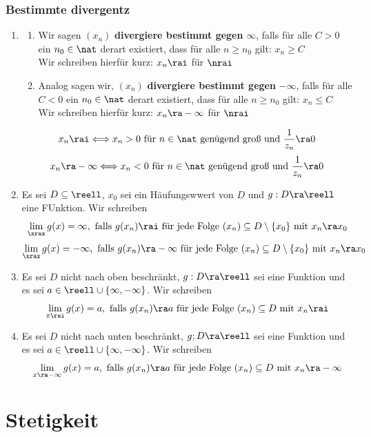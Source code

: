 \documentclass{kit}
\begin{document}
    \subsubsection{Bestimmte divergentz}
      \begin{enumerate}
        \item \begin{enumerate}[label=\roman*)]
            \item Wir sagen $(x_n)$ \textbf{divergiere bestimmt gegen} $\infty$, falls für alle $C>0$ ein $n_0\in\nat$ derart existiert, dass für alle $n\ge n_0$ gilt: $x_n\ge C$\\
              Wir schreiben hierfür kurz: $x_n\rai$ für $\nrai$
            \item Analog sagen wir, $(x_n)$ \textbf{divergiere bestimmt gegen} $-\infty$, falls für alle $C<0$ ein $n_0\in\nat$ derart existiert, dass für alle $n\ge n_0$ gilt: $x_n\le C$\\
              Wir schreiben hierfür kurz: $x_n\ra -\infty$ für $\nrai$
          \end{enumerate}
          $$x_n\rai\Longleftrightarrow x_n>0\text{ für }n\in\nat\text{ genügend groß und }\frac{1}{z_n}\ra0$$
          $$x_n\ra-\infty\Longleftrightarrow x_n<0\text{ für }n\in\nat\text{ genügend groß und }\frac{1}{z_n}\ra0$$
        \item Es sei $D\subseteq\reell$, $x_0$ sei ein Häufungswwert von $D$ und $g:D\ra\reell$ eine FUnktion. Wir schreiben
          $$\lim_\xrax g(x)=\infty,\text{ falls }g(x_n)\rai\text{ für jede Folge }(x_n)\subseteq D\setminus\{x_0\}\text{ mit }x_n\ra x_0$$
          $$\lim_\xrax g(x)=-\infty,\text{ falls }g(x_n)\ra-\infty\text{ für jede Folge }(x_n)\subseteq D\setminus\{x_0\}\text{ mit }x_n\ra x_0$$
        \item Es sei $D$ nicht nach oben beschränkt, $g:D\ra\reell$ sei eine Funktion und es sei $a\in\reell\cup\{\infty,-\infty\}$. Wir schreiben
          $$\lim_{x\rai} g(x)=a,\text{ falls }g(x_n)\ra a\text{ für jede Folge }(x_n)\subseteq D\text{ mit }x_n\rai$$
        \item Es sei $D$ nicht nach unten beschränkt, $g;D\ra\reell$ sei eine Funktion und es sei $a\in\reell\cup\{\infty,-\infty\}$. Wir schreiben
          $$\lim_{x\ra-\infty}g(x)=a,\text{ falls }g(x_n)\ra a\text{ für jede Folge }(x_n)\subseteq D\text{ mit }x_n\ra-\infty$$
      \end{enumerate}
\section{Stetigkeit}
\end{document}
